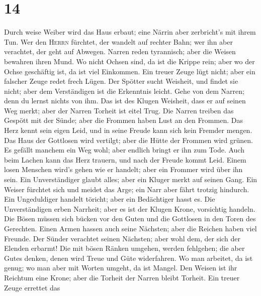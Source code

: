 \hypertarget{section-13}{%
\section{14}\label{section-13}}

 Durch weise Weiber wird das Haus erbaut; eine Närrin aber
zerbricht's mit ihrem Tun.  Wer den \textsc{Herrn}
fürchtet, der wandelt auf rechter Bahn; wer ihn aber verachtet, der geht
auf Abwegen.  Narren reden tyrannisch; aber die Weisen
bewahren ihren Mund.  Wo nicht Ochsen sind, da ist die
Krippe rein; aber wo der Ochse geschäftig ist, da ist viel Einkommen.
 Ein treuer Zeuge lügt nicht; aber ein falscher Zeuge
redet frech Lügen.  Der Spötter sucht Weisheit, und findet
sie nicht; aber dem Verständigen ist die Erkenntnis leicht.
 Gehe von dem Narren; denn du lernst nichts von ihm.
 Das ist des Klugen Weisheit, dass er auf seinen Weg
merkt; aber der Narren Torheit ist eitel Trug.  Die Narren
treiben das Gespött mit der Sünde; aber die Frommen haben Lust an den
Frommen.  Das Herz kennt sein eigen Leid, und in seine
Freude kann sich kein Fremder mengen.  Das Haus der
Gottlosen wird vertilgt; aber die Hütte der Frommen wird grünen.
 Es gefällt manchem ein Weg wohl; aber endlich bringt er
ihn zum Tode.  Auch beim Lachen kann das Herz trauern,
und nach der Freude kommt Leid.  Einem losen Menschen
wird's gehen wie er handelt; aber ein Frommer wird über ihn sein.
 Ein Unverständiger glaubt alles; aber ein Kluger merkt
auf seinen Gang.  Ein Weiser fürchtet sich und meidet das
Arge; ein Narr aber fährt trotzig hindurch.  Ein
Ungeduldiger handelt töricht; aber ein Bedächtiger hasst es.
 Die Unverständigen erben Narrheit; aber es ist der
Klugen Krone, vorsichtig handeln.  Die Bösen müssen sich
bücken vor den Guten und die Gottlosen in den Toren des Gerechten.
 Einen Armen hassen auch seine Nächsten; aber die Reichen
haben viel Freunde.  Der Sünder verachtet seinen
Nächsten; aber wohl dem, der sich der Elenden erbarmt! 
Die mit bösen Ränken umgehen, werden fehlgehen; die aber Gutes denken,
denen wird Treue und Güte widerfahren.  Wo man arbeitet,
da ist genug; wo man aber mit Worten umgeht, da ist Mangel.
 Den Weisen ist ihr Reichtum eine Krone; aber die Torheit
der Narren bleibt Torheit.  Ein treuer Zeuge errettet das
